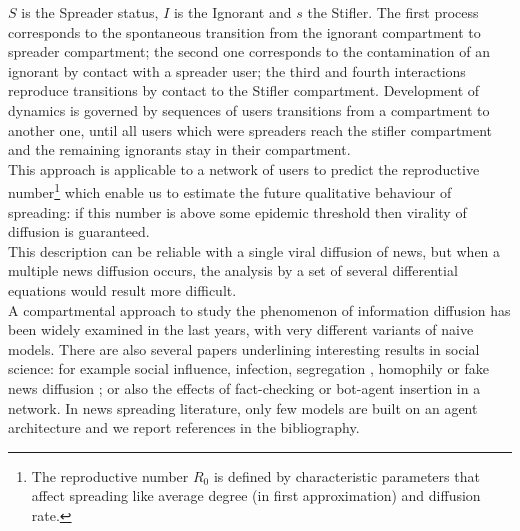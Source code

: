 $S$ is the Spreader status, $I$ is the Ignorant and $s$ the Stifler. 
The first process corresponds to the spontaneous transition from the ignorant compartment to spreader compartment;
 the second one corresponds to the contamination of an ignorant by contact with a spreader user; 
the third and fourth interactions reproduce transitions by contact to the Stifler compartment.
Development of dynamics is governed by sequences of users transitions from a compartment to another one, until all users which were spreaders reach the stifler compartment and the remaining ignorants stay in their compartment.\\
This approach is applicable to a network of users to predict the reproductive 
number\footnote{The reproductive number $R_{0}$ is defined by characteristic parameters that affect spreading like average degree (in first approximation) and diffusion rate. } 
which enable us to estimate the future qualitative behaviour of spreading: 
if this number is above some epidemic threshold then virality of diffusion is guaranteed.\\
This description can be reliable with a single viral diffusion of news, but when a
multiple news diffusion occurs, the analysis by a set of several differential equations would result more difficult.  
 \\ A compartmental approach to study the phenomenon of information diffusion has been widely examined in the last years, with very different variants of naive models. \cite{fedewa2013spread}\cite{tambuscio2016network}
There are also several papers underlining interesting results in social science: for example social influence, infection, segregation \cite{henry2011emergence}, homophily \cite{aiello2012friendship} or fake news diffusion \cite{tambuscio2016network} \cite{nekovee2007theory}; or also the effects of fact-checking or bot-agent insertion \cite{aiello2012people} in a network.
 In news spreading literature, only few models are built on an agent architecture and we report references in the bibliography. \cite{liu2011rumor}\cite{serrano2015novel}\cite{seo2012identifying}\cite{de2013simulation}\cite{serrano2016validating}


